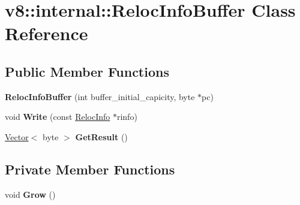 \hypertarget{classv8_1_1internal_1_1_reloc_info_buffer}{}\section{v8\+:\+:internal\+:\+:Reloc\+Info\+Buffer Class Reference}
\label{classv8_1_1internal_1_1_reloc_info_buffer}
\subsection*{Public Member Functions}
\begin{DoxyCompactItemize}
\item 
{\bfseries Reloc\+Info\+Buffer} (int buffer\+\_\+initial\+\_\+capicity, byte $\ast$pc)\hypertarget{classv8_1_1internal_1_1_reloc_info_buffer_a2bb2110b0dd9010980068794f1254a1b}{}\label{classv8_1_1internal_1_1_reloc_info_buffer_a2bb2110b0dd9010980068794f1254a1b}

\item 
void {\bfseries Write} (const \hyperlink{classv8_1_1internal_1_1_reloc_info}{Reloc\+Info} $\ast$rinfo)\hypertarget{classv8_1_1internal_1_1_reloc_info_buffer_a1a204335e2833c88220db6639aadcae6}{}\label{classv8_1_1internal_1_1_reloc_info_buffer_a1a204335e2833c88220db6639aadcae6}

\item 
\hyperlink{classv8_1_1internal_1_1_vector}{Vector}$<$ byte $>$ {\bfseries Get\+Result} ()\hypertarget{classv8_1_1internal_1_1_reloc_info_buffer_a6a45a162563bc5d00f1533d89a70d04e}{}\label{classv8_1_1internal_1_1_reloc_info_buffer_a6a45a162563bc5d00f1533d89a70d04e}

\end{DoxyCompactItemize}
\subsection*{Private Member Functions}
\begin{DoxyCompactItemize}
\item 
void {\bfseries Grow} ()\hypertarget{classv8_1_1internal_1_1_reloc_info_buffer_a0723e3a3cbda2de351b95713d1504d43}{}\label{classv8_1_1internal_1_1_reloc_info_buffer_a0723e3a3cbda2de351b95713d1504d43}

\end{DoxyCompactItemize}
